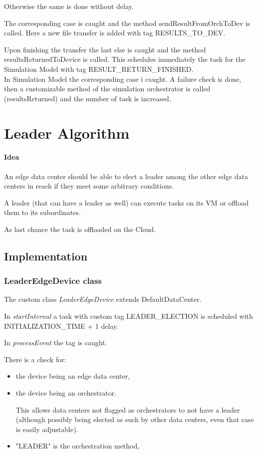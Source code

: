 \documentclass[12pt]{report}
\begin{document}
Otherwise the same is done without delay.

The corresponding case is caught and the method sendResultFromOrchToDev is called. Here a new file transfer is added with tag RESULTS\_TO\_DEV.

Upon finishing the transfer the last else is caught and the method \mbox{resultsReturnedToDevice} is called. This schedules immediately the task for the Simulation Model with tag RESULT\_RETURN\_FINISHED.
\\
In Simulation Model the corresponding case i caught. A failure check is done, then a customizable method of the simulation orchestrator is called (resultsReturned) and the number of task is increased.

\section{Leader Algorithm}
\label{leader algo}
\paragraph*{Idea}
An edge data center should be able to elect a leader among the other edge data centers in reach if they meet some arbitrary conditions.

A leader (that can have a leader as well) can execute tasks on its VM or offload them to its subordinates.

As last chance the task is offloaded on the Cloud.

\subsection*{Implementation}

\subsubsection*{LeaderEdgeDevice class}
The custom class \textit{LeaderEdgeDevice} extends DefaultDataCenter.

In \textit{startInternal} a task with custom tag LEADER\_ELECTION is scheduled with INITIALIZATION\_TIME + 1 delay.

In \textit{processEvent} the tag is caught.

There is a check for:
 	\begin{itemize}
 		\item the device being an edge data center,
 		\item the device being an orchestrator.
 		
 		This allows data centers not flagged as orchestrators to not have a leader (although possibly being elected as such by other data centers, even that case is easily adjustable).
 		\item "LEADER" is the orchestration method,
  	\end{itemize}
\end{document}
